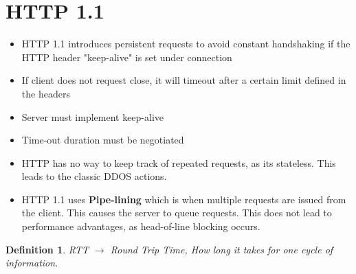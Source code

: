 \documentclass[twoside]{article}
\newtheorem{definition}[theorem]{Definition}
\begin{document}
\section{HTTP 1.1}
\begin{itemize}
\item HTTP 1.1 introduces persistent requests to avoid constant handshaking if the HTTP header "keep-alive" is  set under connection
\item If client does not request close, it will timeout after a certain limit defined in the headers
\item Server must implement keep-alive
\item Time-out duration must be negotiated
\item HTTP has no way to keep track of repeated requests, as its stateless. This leads to the classic DDOS actions.
\item HTTP 1.1 uses \textbf{Pipe-lining} which is when multiple requests are issued from the client. This causes the server to queue requests. This does not lead to performance advantages, as head-of-line blocking occurs.
\end{itemize}

\begin{definition}
RTT \(\rightarrow\) Round Trip Time, How long it takes for one cycle of information. 
\end{definition}
\end{document}
